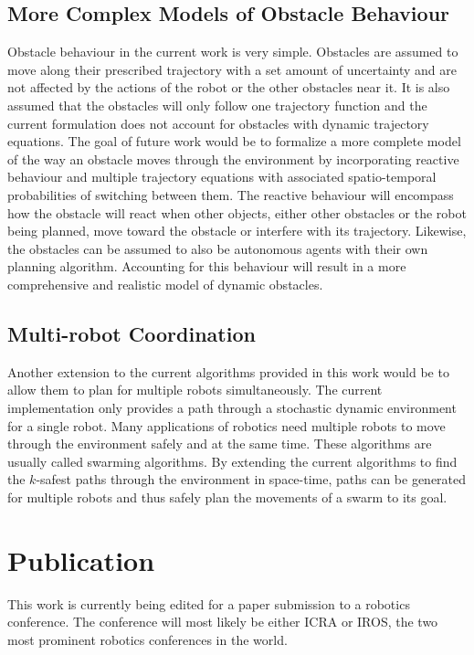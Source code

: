 \subsection{More Complex Models of Obstacle Behaviour}

Obstacle behaviour in the current work is very simple. Obstacles are assumed to
move along their prescribed trajectory with a set amount of uncertainty and are
not affected by the actions of the robot or the other obstacles near it. It is
also assumed that the obstacles will only follow one trajectory function and
the current formulation does not account for obstacles with dynamic trajectory
equations. The goal of future work would be to formalize a more complete model
of the way an obstacle moves through the environment by incorporating reactive
behaviour and multiple trajectory equations with associated spatio-temporal
probabilities of switching between them. The reactive behaviour will encompass
how the obstacle will react when other objects, either other obstacles or the
robot being planned, move toward the obstacle or interfere with its trajectory.
Likewise, the obstacles can be assumed to also be autonomous agents with their
own planning algorithm. Accounting for this behaviour will result in a more
comprehensive and realistic model of dynamic obstacles.

\subsection{Multi-robot Coordination}

Another extension to the current algorithms provided in this work would be to
allow them to plan for multiple robots simultaneously. The current
implementation only provides a path through a stochastic dynamic environment
for a single robot. Many applications of robotics need multiple robots to move
through the environment safely and at the same time. These algorithms are
usually called swarming algorithms. By extending the current algorithms to find
the $k$-safest paths through the environment in space-time, paths can be
generated for multiple robots and thus safely plan the movements of a swarm to
its goal.

\section{Publication}

This work is currently being edited for a paper submission to a robotics
conference. The conference will most likely be either ICRA or IROS, the two
most prominent robotics conferences in the world.

